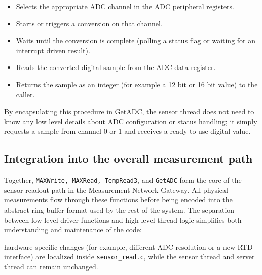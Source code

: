 \begin{itemize}
    \item Selects the appropriate ADC channel in the ADC peripheral registers.
    \item Starts or triggers a conversion on that channel.
    \item Waits until the conversion is complete (polling a status flag or waiting for an interrupt driven result).
    \item Reads the converted digital sample from the ADC data register.
    \item Returns the sample as an integer (for example a 12 bit or 16 bit value) to the caller.
\end{itemize}
By encapsulating this procedure in GetADC, the sensor thread does not need to know any low level details about ADC configuration or status handling; it simply requests a sample from channel 0 or 1 and receives a ready to use digital value.


\subsection{Integration into the overall measurement path}
Together, \texttt{MAXWrite, MAXRead, TempRead3}, and \texttt{GetADC} form the core of the sensor readout path in the Measurement Network Gateway. All physical measurements flow through these functions before being encoded into the abstract ring buffer format used by the rest of the system. The separation between low level driver functions and high level thread logic simplifies both understanding and maintenance of the code:

hardware specific changes (for example, different ADC resolution or a new RTD interface) are localized inside \texttt{sensor\_read.c}, while the sensor thread and server thread can remain unchanged.
